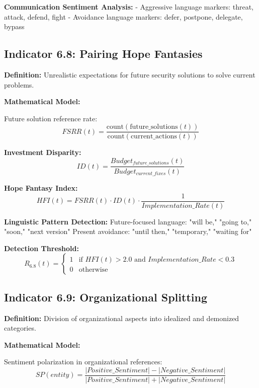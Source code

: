 \documentclass[11pt,a4paper]{article}
\begin{document}
\textbf{Communication Sentiment Analysis:}
- Aggressive language markers: threat, attack, defend, fight
- Avoidance language markers: defer, postpone, delegate, bypass

\subsection{Indicator 6.8: Pairing Hope Fantasies}

\textbf{Definition:} Unrealistic expectations for future security solutions to solve current problems.

\textbf{Mathematical Model:}

Future solution reference rate:
\begin{equation}
FSRR(t) = \frac{\text{count}(\text{future\_solutions}(t))}{\text{count}(\text{current\_actions}(t))}
\end{equation}

\textbf{Investment Disparity:}
\begin{equation}
ID(t) = \frac{Budget_{future\_solutions}(t)}{Budget_{current\_fixes}(t)}
\end{equation}

\textbf{Hope Fantasy Index:}
\begin{equation}
HFI(t) = FSRR(t) \cdot ID(t) \cdot \frac{1}{Implementation\_Rate(t)}
\end{equation}

\textbf{Linguistic Pattern Detection:}
Future-focused language: "will be," "going to," "soon," "next version"
Present avoidance: "until then," "temporary," "waiting for"

\textbf{Detection Threshold:}
\begin{equation}
R_{6.8}(t) = \begin{cases}
1 & \text{if } HFI(t) > 2.0 \text{ and } Implementation\_Rate < 0.3 \\
0 & \text{otherwise}
\end{cases}
\end{equation}

\subsection{Indicator 6.9: Organizational Splitting}

\textbf{Definition:} Division of organizational aspects into idealized and demonized categories.

\textbf{Mathematical Model:}

Sentiment polarization in organizational references:
\begin{equation}
SP(entity) = \frac{|Positive\_Sentiment| - |Negative\_Sentiment|}{|Positive\_Sentiment| + |Negative\_Sentiment|}
\end{equation}
\end{document}
